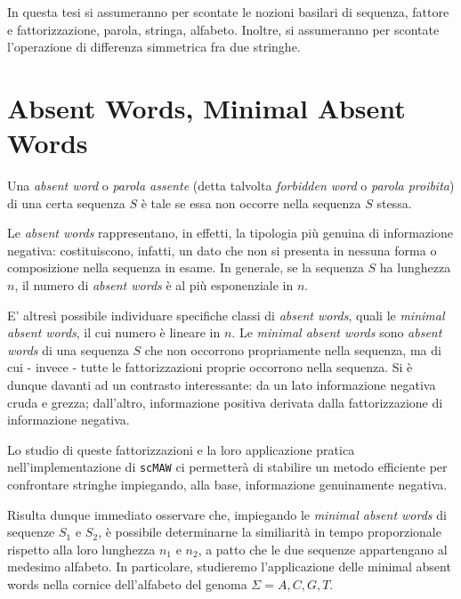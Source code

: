In questa tesi si assumeranno per scontate le nozioni basilari di sequenza, fattore e fattorizzazione, parola, stringa, alfabeto. Inoltre, si assumeranno per scontate l'operazione di differenza simmetrica fra due stringhe.

\section{Absent Words, Minimal Absent Words}

Una \textit{absent word} o \textit{parola assente} (detta talvolta \textit{forbidden word} o \textit{parola proibita}) di una certa sequenza $S$ è tale se essa non occorre nella sequenza $S$ stessa. 

Le \textit{absent words} rappresentano, in effetti, la tipologia più genuina di informazione negativa: costituiscono, infatti, un dato che non si presenta in nessuna forma o composizione nella sequenza in esame. In generale, se la sequenza $S$ ha lunghezza $n$, il numero di \textit{absent words} è al più esponenziale in $n$. 

\vspace{3mm}

E' altresì possibile individuare specifiche classi di \textit{absent words}, quali le \textit{minimal absent words}, il cui numero è lineare in $n$. Le \textit{minimal absent words} sono \textit{absent words} di una sequenza $S$ che non occorrono propriamente nella sequenza, ma di cui - invece - tutte le fattorizzazioni proprie occorrono nella sequenza. Si è dunque davanti ad un contrasto interessante: da un lato informazione negativa cruda e grezza; dall'altro, informazione positiva derivata dalla fattorizzazione di informazione negativa. 

\vspace{3mm}

Lo studio di queste fattorizzazioni e la loro applicazione pratica nell'implementazione di \verb|scMAW| ci permetterà di stabilire un metodo efficiente per confrontare stringhe impiegando, alla base, informazione genuinamente negativa.

\vspace{3mm}

Risulta dunque immediato osservare che, impiegando le \textit{minimal absent words} di sequenze $S_1$ e $S_2$, è possibile determinarne la similiarità in tempo proporzionale rispetto alla loro lunghezza $n_1$ e $n_2$, a patto che le due sequenze appartengano al medesimo alfabeto. In particolare, studieremo l'applicazione delle minimal absent words nella cornice dell'alfabeto del genoma $\Sigma={A, C, G, T}$.

